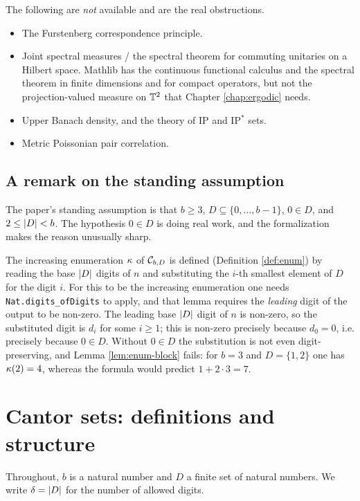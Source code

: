 The following are \emph{not} available and are the real obstructions.

\begin{itemize}
  \item The Furstenberg correspondence principle.
  \item Joint spectral measures / the spectral theorem for commuting unitaries
    on a Hilbert space. Mathlib has the continuous functional calculus and the
    spectral theorem in finite dimensions and for compact operators, but not
    the projection-valued measure on $\mathbb{T}^2$ that Chapter \ref{chap:ergodic}
    needs.
  \item Upper Banach density, and the theory of IP and IP$^*$ sets.
  \item Metric Poissonian pair correlation.
\end{itemize}

\section{A remark on the standing assumption}

The paper's standing assumption is that $b \geq 3$, $D \subseteq
\{0,\ldots,b-1\}$, $0 \in D$, and $2 \leq \left\lvert D \right\rvert < b$. The hypothesis $0 \in
D$ is doing real work, and the formalization makes the reason unusually sharp.

The increasing enumeration $\kappa$ of $\mathcal{C}_{b,D}$ is defined (Definition
\ref{def:enum}) by reading the base $\left\lvert D \right\rvert$ digits of $n$ and substituting
the $i$-th smallest element of $D$ for the digit $i$. For this to be the
increasing enumeration one needs \texttt{Nat.digits\_ofDigits} to apply, and
that lemma requires the \emph{leading} digit of the output to be non-zero.
The leading base $\left\lvert D \right\rvert$ digit of $n$ is non-zero, so the substituted digit
is $d_i$ for some $i \geq 1$; this is non-zero precisely because $d_0 = 0$,
i.e. precisely because $0 \in D$. Without $0 \in D$ the substitution is not
even digit-preserving, and Lemma \ref{lem:enum-block} fails: for $b = 3$ and
$D = \{1,2\}$ one has $\kappa(2) = 4$, whereas the formula would predict
$1 + 2\cdot 3 = 7$.

\chapter{Cantor sets: definitions and structure}
\label{chap:structure}

Throughout, $b$ is a natural number and $D$ a finite set of natural numbers.
We write $\delta = \left\lvert D \right\rvert$ for the number of allowed digits.

